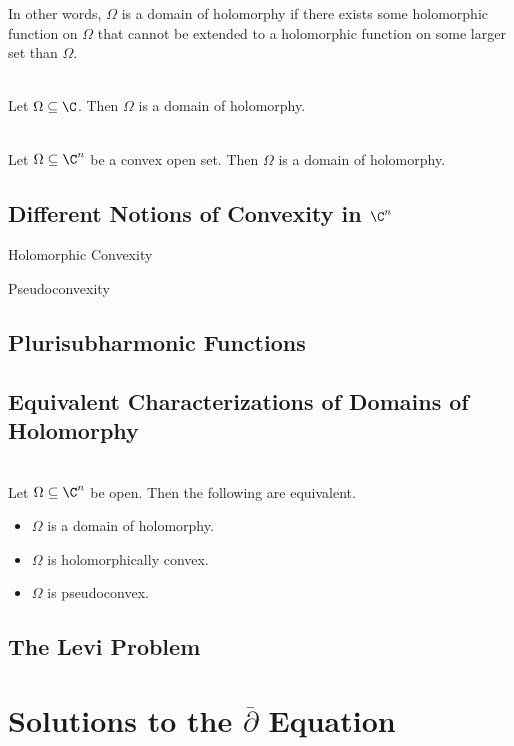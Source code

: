 \documentclass[a4paper]{article}
\begin{document}
In other words, $\Omega$ is a domain of holomorphy if there exists some holomorphic function on $\Omega$ that cannot be extended to a holomorphic function on some larger set than $\Omega$. 

\begin{lmm}{}{}\\
Let $\Omega\subseteq\C$. Then $\Omega$ is a domain of holomorphy. 
\end{lmm}

\begin{lmm}{}{}\\
Let $\Omega\subseteq\C^n$ be a convex open set. Then $\Omega$ is a domain of holomorphy. 
\end{lmm}

\subsection{Different Notions of Convexity in $\C^n$}
\begin{defn}{Holomorphic Convexity}{}
\end{defn}

\begin{defn}{Pseudoconvexity}{}
\end{defn}

\subsection{Plurisubharmonic Functions}

\subsection{Equivalent Characterizations of Domains of Holomorphy}
\begin{prp}{}{}\\
Let $\Omega\subseteq\C^n$ be open. Then the following are equivalent. 
\begin{itemize}
\item $\Omega$ is a domain of holomorphy. 
\item $\Omega$ is holomorphically convex. 
\item $\Omega$ is pseudoconvex. 
\end{itemize}
\end{prp}

\subsection{The Levi Problem}

\pagebreak
\section{Solutions to the $\overline{\partial}$ Equation}
\end{document}
